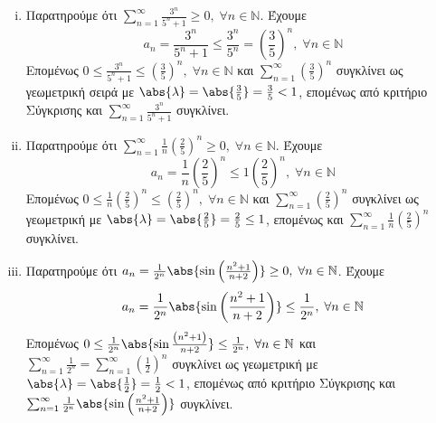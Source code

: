 \begin{enumerate}
\begin{enumerate}[i)]
        \item Παρατηρούμε ότι $ \sum_{n=1}^{\infty} \frac{3^{n}}{5^{n}+1} \geq 0, 
            \; \forall n \in \mathbb{N}$. Έχουμε
            \[
                a_{n} = \frac{3^{n}}{5^{n}+1} \leq \frac{3^{n}}{5^{n}} = 
                \left(\frac{3}{5}\right)^{n}, \; \forall n \in \mathbb{N} 
            \] 
            Επομένως $ 0 \leq \frac{3^{n}}{5^{n}+1} \leq \left(\frac{3}{5} \right)^{n},
            \; \forall n \in \mathbb{N} $ και $ \sum_{n=1}^{\infty} 
            \left(\frac{3}{5} \right)^{n}$
            συγκλίνει ως γεωμετρική σειρά με $ \abs{\lambda} = \abs{\frac{3}{5}} = 
            \frac{3}{5} < 1 $, επομένως από κριτήριο Σύγκρισης και 
            $ \sum_{n=1}^{\infty} \frac{3^{n}}{5^{n}+1} $ συγκλίνει.

        \item Παρατηρούμε ότι $ \sum_{n=1}^{\infty} \frac{1}{n} 
            \left(\frac{2}{5} \right)^{n} \geq 0, \; \forall n \in \mathbb{N} $. Έχουμε
            \[
                a_{n} = \frac{1}{n} \left(\frac{2}{5} \right)^{n} \leq 1
                \left(\frac{2}{5} \right)^{n}, \; \forall n \in \mathbb{N}
            \] 
            Επομένως $ 0 \leq \frac{1}{n} \left(\frac{2}{5} \right)^{n} \leq 
            \left(\frac{2}{5}\right)^{n}, \; \forall n \in \mathbb{N}$ και 
            $ \sum_{n=1}^{\infty} \left(\frac{2}{5} \right)^{n} $ συγκλίνει 
            ως γεωμετρική με $ \abs{\lambda} = \abs{\frac{2}{5}} = \frac{2}{5} \leq 1$,
            επομένως και $ \sum_{n=1}^{\infty} \frac{1}{n} \left(\frac{2}{5} 
            \right)^{n} $ συγκλίνει.

        \item Παρατηρούμε ότι $ a_{n} = \frac{1}{2^{n}} 
            \abs{\sin{\left(\frac{n^{2}+1}{n+2}\right)}} \geq 0, \; 
            \forall n \in \mathbb{N}$.  Έχουμε
            \[
                a_{n} = \frac{1}{2^{n}} \abs{\sin{\left(\frac{n^{2}+1}{n+2}\right)}} 
                \leq \frac{1}{2^{n}}, \; \forall n \in \mathbb{N}
            \] 
            Επομένως $ 0 \leq \frac{1}{2^{n}} 
            \abs{\sin{\frac{\left(n^{2}+1\right)}{n+2}}} \leq \frac{1}{2^{n}}, 
            \; \forall n \in \mathbb{N}$ και $ \sum_{n=1}^{\infty} \frac{1}{2^{n}} = 
            \sum_{n=1}^{\infty} \left(\frac{1}{2}\right)^{n} $ συγκλίνει 
            ως γεωμετρική με $ \abs{\lambda} = \abs{\frac{1}{2}} = \frac{1}{2} < 1 $, 
            επομένως από κριτήριο Σύγκρισης και $ \sum_{n=1}^{\infty} \frac{1}{2^{n}} 
            \abs{\sin{\left(\frac{n^{2}+1}{n+2}\right)}} $ συγκλίνει.


\end{enumerate}
\end{enumerate}
